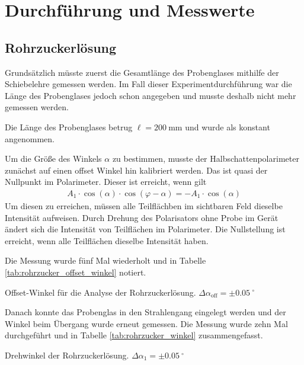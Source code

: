 \documentclass{article}
\begin{document}
\section{Durchführung und Messwerte}

\subsection{Rohrzuckerlösung}

Grundsätzlich müsste zuerst die Gesamtlänge des Probenglases mithilfe der Schiebelehre gemessen werden. Im Fall dieser Experimentdurchführung war die Länge des Probenglases jedoch schon angegeben und musste deshalb nicht mehr gemessen werden.

Die Länge des Probenglases betrug $\ell = 200~$mm und wurde als konstant angenommen.


Um die Größe des Winkels $\alpha$ zu bestimmen, musste der Halbschattenpolarimeter zunächst auf einen offset Winkel hin kalibriert werden. Das ist quasi der Nullpunkt im Polarimeter. Dieser ist erreicht, wenn gilt
\begin{align*}
A_1\cdot\cos(\alpha)\cdot\cos(\varphi-\alpha) = -A_1\cdot\cos(\alpha)
\end{align*}
Um diesen zu erreichen, müssen alle Teilflächben im sichtbaren Feld dieselbe Intensität aufweisen. Durch Drehung des Polarisators ohne Probe im Gerät ändert sich die Intensität von Teilflächen im Polarimeter. Die Nullstellung ist erreicht, wenn alle Teilflächen dieselbe Intensität haben. 



Die Messung wurde fünf Mal wiederholt und in Tabelle \ref{tab:rohrzucker_offset_winkel} notiert.

\begin{table}[H]
\caption{Offset-Winkel für die Analyse der Rohrzuckerlösung. $\Delta\alpha_\text{off} = \pm 0.05~^\circ$}
\label{tab:rohrzucker_offset_winkel}
\centering

\end{table}



Danach konnte das Probenglas in den Strahlengang eingelegt werden und der Winkel beim Übergang wurde erneut gemessen. Die Messung wurde zehn Mal durchgeführt und in Tabelle \ref{tab:rohrzucker_winkel} zusammengefasst.


\begin{table}[H]
\caption{Drehwinkel der Rohrzuckerlösung. $\Delta\alpha_1 = \pm 0.05~^\circ$}
\label{tab:rohrzucker_winkel}
\centering

\end{table}
\end{document}
